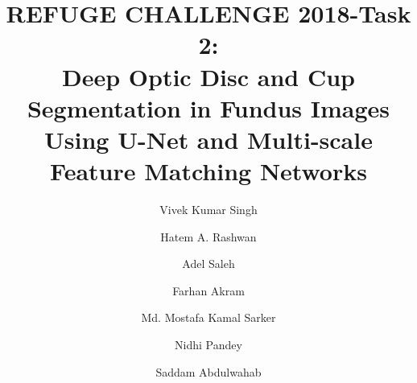 \documentclass[runningheads,a4paper]{llncs}
\begin{document}
\mainmatter  %

\title{REFUGE CHALLENGE 2018-Task 2:\\ Deep Optic Disc and Cup Segmentation in Fundus Images Using U-Net and Multi-scale Feature Matching Networks}


%
%

\author{Vivek Kumar Singh \and Hatem A. Rashwan  \and Adel Saleh \and Farhan Akram  \and Md. Mostafa Kamal Sarker \and Nidhi Pandey \and Saddam Abdulwahab  }


%




%
%
\end{document}
